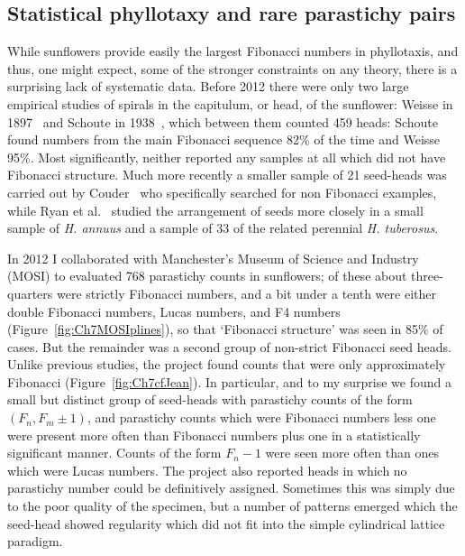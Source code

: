   \subsection{Statistical phyllotaxy and rare parastichy pairs}
  While sunflowers provide easily the largest Fibonacci numbers in phyllotaxis, and thus, one might expect, some of the stronger
  constraints on any theory, there is a surprising lack of systematic data.
  Before 2012 there were only two large empirical studies of spirals in the capitulum, or head, of the sunflower: Weisse in 1897~\cite{weisseZahlRandbluthenCompositenkopfchen1897} and Schoute in 1938~\cite{schouteWhorledPhyllotaxisIV1938}, which between them counted 459 heads: Schoute found numbers from the main Fibonacci sequence 82\% of the time and Weisse 95\%. 
  Most significantly, neither reported any samples at all which did not have Fibonacci structure. 
  Much more recently a smaller sample of 21 seed-heads was carried out 
  by Couder~\cite{couderInitialTransitionsOrder1998} who specifically searched for non Fibonacci examples, while
  Ryan et al.~\cite{ryanQuantitativeAnalysisSunflower1990} studied the arrangement of seeds more closely in a small sample of \emph{H. annuus} and a sample of 33 of the
  related perennial \emph{H. tuberosus}. 
  
 In 2012 I collaborated with Manchester's Museum of Science and Industry (MOSI)\autocite{swintonNovelFibonacciNonFibonacci2016} to evaluated 768 parastichy counts in sunflowers; of these about three-quarters were strictly 
 Fibonacci numbers, and a bit under a tenth
  were either  double Fibonacci numbers, Lucas numbers, and F4 numbers (Figure~\ref{fig:Ch7MOSIplines}), so that `Fibonacci structure' was seen in 85\% of cases. 
 But the remainder was a second group of non-strict Fibonacci seed heads.  Unlike previous studies, the project  found counts that were only approximately Fibonacci (Figure~\ref{fig:Ch7cfJean}).
  In particular, and to my surprise we found a small but distinct group of seed-heads with parastichy counts of the form $(F_n,F_{m}\pm 1)$, and parastichy counts which were  Fibonacci numbers 
  less one  were present more often than   Fibonacci numbers plus one in a statistically significant manner. Counts of the form $F_n-1$ were seen more often than ones which were Lucas numbers.
  The project also reported heads in which no parastichy number could be definitively assigned. Sometimes this was simply due to the poor quality of the specimen, but a number of patterns emerged which the seed-head showed regularity which did not fit into the simple cylindrical lattice paradigm. 
  
